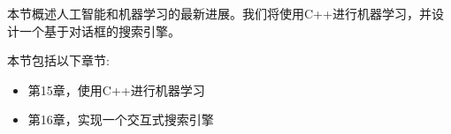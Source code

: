 本节概述人工智能和机器学习的最新进展。我们将使用C++进行机器学习，并设计一个基于对话框的搜索引擎。 \par

本节包括以下章节: \par

\begin{itemize}
	\item 第15章，使用C++进行机器学习
	\item 第16章，实现一个交互式搜索引擎
\end{itemize}

\newpage